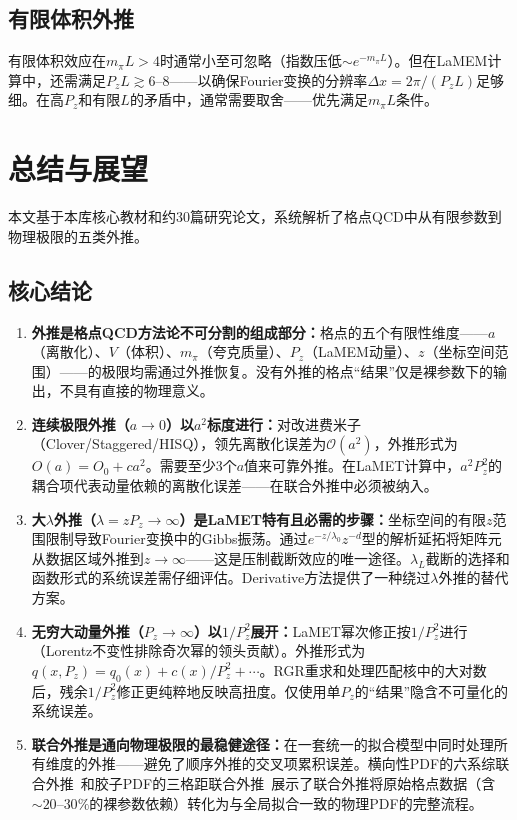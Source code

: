 \documentclass[12pt,a4paper]{ctexart}
\theoremstyle{definition}
\begin{document}
\subsection{有限体积外推}

有限体积效应在$m_\pi L > 4$时通常小至可忽略（指数压低$\sim e^{-m_\pi L}$）。但在LaMEM计算中，还需满足$P_z L \gtrsim 6\text{--}8$——以确保Fourier变换的分辨率$\Delta x = 2\pi/(P_z L)$足够细。在高$P_z$和有限$L$的矛盾中，通常需要取舍——优先满足$m_\pi L$条件。

\section{总结与展望}

本文基于本库核心教材和约30篇研究论文，系统解析了格点QCD中从有限参数到物理极限的五类外推。

\subsection*{核心结论}

\begin{enumerate}[leftmargin=*]
    \item \textbf{外推是格点QCD方法论不可分割的组成部分：}格点的五个有限性维度——$a$（离散化）、$V$（体积）、$m_\pi$（夸克质量）、$P_z$（LaMEM动量）、$z$（坐标空间范围）——的极限均需通过外推恢复。没有外推的格点``结果''仅是裸参数下的输出，不具有直接的物理意义。

    \item \textbf{连续极限外推（$a\to 0$）以$a^2$标度进行：}对改进费米子（Clover/Staggered/HISQ），领先离散化误差为$\mathcal{O}(a^2)$，外推形式为$O(a) = O_0 + c a^2$。需要至少3个$a$值来可靠外推。在LaMET计算中，$a^2 P_z^2$的耦合项代表动量依赖的离散化误差——在联合外推中必须被纳入。

    \item \textbf{大$\lambda$外推（$\lambda = zP_z \to \infty$）是LaMET特有且必需的步骤：}坐标空间的有限$z$范围限制导致Fourier变换中的Gibbs振荡。通过$e^{-z/\lambda_0} z^{-d}$型的解析延拓将矩阵元从数据区域外推到$z\to\infty$——这是压制截断效应的唯一途径。$\lambda_L$截断的选择和函数形式的系统误差需仔细评估。Derivative方法提供了一种绕过$\lambda$外推的替代方案。

    \item \textbf{无穷大动量外推（$P_z\to\infty$）以$1/P_z^2$展开：}LaMET幂次修正按$1/P_z^2$进行（Lorentz不变性排除奇次幂的领头贡献）。外推形式为$q(x,P_z) = q_0(x) + c(x)/P_z^2 + \cdots$。RGR重求和处理匹配核中的大对数后，残余$1/P_z^2$修正更纯粹地反映高扭度。仅使用单$P_z$的``结果''隐含不可量化的系统误差。

    \item \textbf{联合外推是通向物理极限的最稳健途径：}在一套统一的拟合模型中同时处理所有维度的外推——避免了顺序外推的交叉项累积误差。横向性PDF的六系综联合外推~\cite{NucleonTransversity2024}和胶子PDF的三格距联合外推~\cite{Chen2025gluon}展示了联合外推将原始格点数据（含$\sim 20\text{--}30\%$的裸参数依赖）转化为与全局拟合一致的物理PDF的完整流程。

\end{enumerate}
\end{document}
